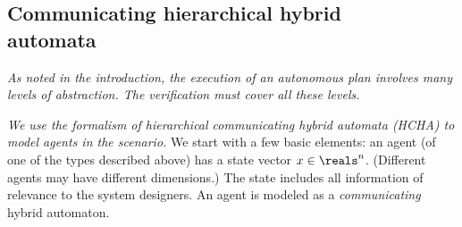 \subsection{Communicating hierarchical hybrid \\automata}
\label{HCHA}
{\it As noted in the introduction, the execution of an autonomous plan involves many levels of abstraction. The verification must cover all these levels.}

{\it We use the formalism of hierarchical  communicating hybrid automata (HCHA) to model agents in the scenario. }
We start with a few basic elements:
an agent (of one of the types described above) has a state vector $\stPt \in \reals^n$.
(Different agents may have different dimensions.)
The state includes all information of relevance to the system designers.%
An agent is modeled as a \emph{communicating} hybrid automaton.

